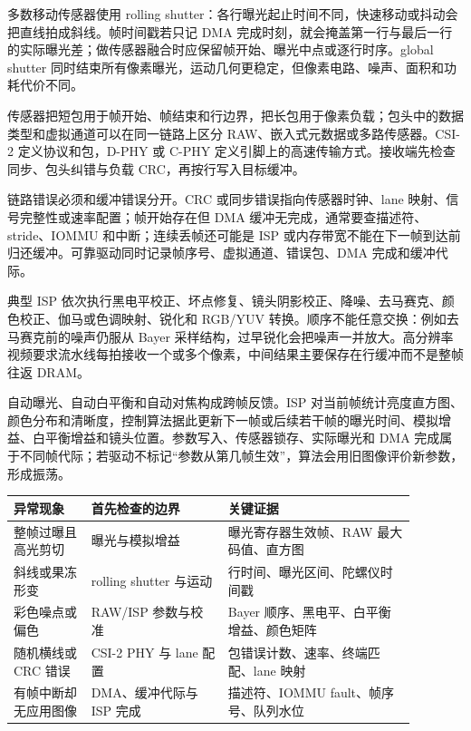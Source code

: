多数移动传感器使用 rolling shutter：各行曝光起止时间不同，快速移动或抖动会把直线拍成斜线。帧时间戳若只记 DMA 完成时刻，就会掩盖第一行与最后一行的实际曝光差；做传感器融合时应保留帧开始、曝光中点或逐行时序。global shutter 同时结束所有像素曝光，运动几何更稳定，但像素电路、噪声、面积和功耗代价不同。


传感器把短包用于帧开始、帧结束和行边界，把长包用于像素负载；包头中的数据类型和虚拟通道可以在同一链路上区分 RAW、嵌入式元数据或多路传感器。CSI-2 定义协议和包，D-PHY 或 C-PHY 定义引脚上的高速传输方式。接收端先检查同步、包头纠错与负载 CRC，再按行写入目标缓冲。

链路错误必须和缓冲错误分开。CRC 或同步错误指向传感器时钟、lane 映射、信号完整性或速率配置；帧开始存在但 DMA 缓冲无完成，通常要查描述符、stride、IOMMU 和中断；连续丢帧还可能是 ISP 或内存带宽不能在下一帧到达前归还缓冲。可靠驱动同时记录帧序号、虚拟通道、错误包、DMA 完成和缓冲代际。


典型 ISP 依次执行黑电平校正、坏点修复、镜头阴影校正、降噪、去马赛克、颜色校正、伽马或色调映射、锐化和 RGB/YUV 转换。顺序不能任意交换：例如去马赛克前的噪声仍服从 Bayer 采样结构，过早锐化会把噪声一并放大。高分辨率视频要求流水线每拍接收一个或多个像素，中间结果主要保存在行缓冲而不是整帧往返 DRAM。

自动曝光、自动白平衡和自动对焦构成跨帧反馈。ISP 对当前帧统计亮度直方图、颜色分布和清晰度，控制算法据此更新下一帧或后续若干帧的曝光时间、模拟增益、白平衡增益和镜头位置。参数写入、传感器锁存、实际曝光和 DMA 完成属于不同帧代际；若驱动不标记“参数从第几帧生效”，算法会用旧图像评价新参数，形成振荡。

\begin{longtable}{L{0.17\linewidth}L{0.30\linewidth}L{0.41\linewidth}}
\toprule
异常现象 & 首先检查的边界 & 关键证据 \\
\midrule
整帧过曝且高光剪切 & 曝光与模拟增益 & 曝光寄存器生效帧、RAW 最大码值、直方图 \\\tablerowrule
斜线或果冻形变 & rolling shutter 与运动 & 行时间、曝光区间、陀螺仪时间戳 \\\tablerowrule
彩色噪点或偏色 & RAW/ISP 参数与校准 & Bayer 顺序、黑电平、白平衡增益、颜色矩阵 \\\tablerowrule
随机横线或 CRC 错误 & CSI-2 PHY 与 lane 配置 & 包错误计数、速率、终端匹配、lane 映射 \\\tablerowrule
有帧中断却无应用图像 & DMA、缓冲代际与 ISP 完成 & 描述符、IOMMU fault、帧序号、队列水位 \\
\bottomrule
\end{longtable}

